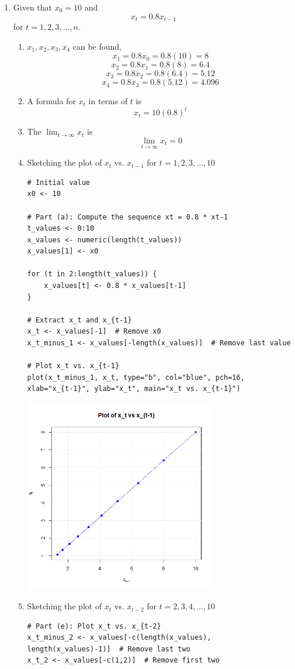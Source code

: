 \documentclass[12pt]{article}
\begin{document}
\begin{enumerate}
    \item Given that $x_0 = 10$ and 
    \[ x_t = 0.8x_{t-1} \] for $t = 1, 2, 3, \ldots, n$.

    \begin{enumerate}
        \item $x_1, x_2, x_3, x_4$ can be found,
        \[ x_1 = 0.8x_0 = 0.8(10) = 8 \]
        \[ x_2 = 0.8x_1 = 0.8(8) = 6.4 \]
        \[ x_3 = 0.8x_2 = 0.8(6.4) = 5.12 \]
        \[ x_4 = 0.8x_3 = 0.8(5.12) = 4.096 \]
        \item A formula for $x_t$ in terms of $t$ is
        \[ x_t = 10(0.8)^t \]
        \item The $\lim_{t \to \infty} x_t$ is
        \[ \lim_{t \to \infty} x_t = 0 \]
        \item Sketching the plot of $x_t$ vs. 
        $x_{t-1}$ for $t = 1, 2, 3, \ldots, 10$
        \begin{verbatim}
# Initial value
x0 <- 10

# Part (a): Compute the sequence xt = 0.8 * xt-1
t_values <- 0:10
x_values <- numeric(length(t_values))
x_values[1] <- x0

for (t in 2:length(t_values)) {
    x_values[t] <- 0.8 * x_values[t-1]
}

# Extract x_t and x_{t-1}
x_t <- x_values[-1]  # Remove x0
x_t_minus_1 <- x_values[-length(x_values)]  # Remove last value

# Plot x_t vs. x_{t-1}
plot(x_t_minus_1, x_t, type="b", col="blue", pch=16, 
xlab="x_{t-1}", ylab="x_t", main="x_t vs. x_{t-1}")

\end{verbatim}
        \begin{center}
            \includegraphics[width=0.7\textwidth]{Rplot06.png}
        \end{center}
        \item Sketching the plot of $x_t$ vs. 
        $x_{t-2}$ for $t = 2, 3, 4, \ldots, 10$
\begin{verbatim}
# Part (e): Plot x_t vs. x_{t-2}
x_t_minus_2 <- x_values[-c(length(x_values), 
length(x_values)-1)]  # Remove last two
x_t_2 <- x_values[-c(1,2)]  # Remove first two


\end{verbatim}
\end{enumerate}
\end{enumerate}
\end{document}
